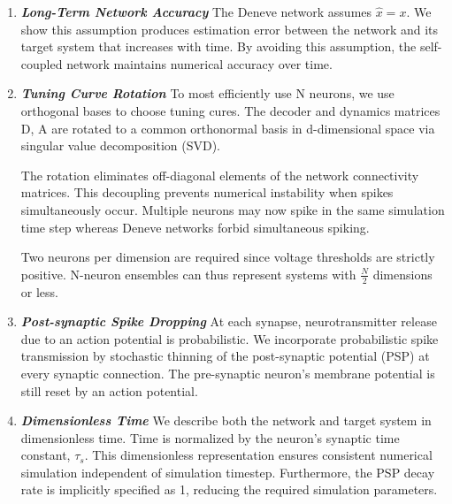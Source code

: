 \begin{enumerate}
    \item \textbf{\textit{Long-Term Network Accuracy}} The Deneve network assumes $\hat{x}=x$. We show this assumption produces estimation error between the network and its target system that increases with time. By avoiding this assumption, the self-coupled network maintains numerical accuracy over time. 
    
    \item \textbf{\textit{Tuning Curve Rotation}} To most efficiently use N neurons, we use orthogonal bases to choose tuning cures. The decoder and dynamics matrices D, A are rotated to a common orthonormal basis in d-dimensional space via singular value decomposition (SVD).

    The rotation eliminates off-diagonal elements of the network connectivity matrices.  This decoupling prevents numerical instability when spikes simultaneously occur.  Multiple neurons may now spike in the same simulation time step whereas Deneve networks forbid simultaneous spiking.  
    
    Two neurons per dimension are required since voltage thresholds are strictly positive.
    N-neuron ensembles can thus represent systems with $\frac{N}{2}$ dimensions or less. 
    
    \item \textbf{\textit{Post-synaptic Spike Dropping}} At each synapse, neurotransmitter release due to an action potential is probabilistic.  We incorporate probabilistic spike transmission by stochastic thinning of the post-synaptic potential (PSP) at every synaptic connection. The pre-synaptic neuron's membrane potential is still reset by an action potential. 
    
    \item \textbf{\textit{Dimensionless Time}} We describe both the network and target system in dimensionless time. Time is normalized by the neuron's synaptic time constant, $\tau_s$. This dimensionless representation ensures consistent numerical simulation independent of simulation timestep. Furthermore, the PSP decay rate is implicitly specified as 1, reducing the required simulation parameters.     
\end{enumerate}

